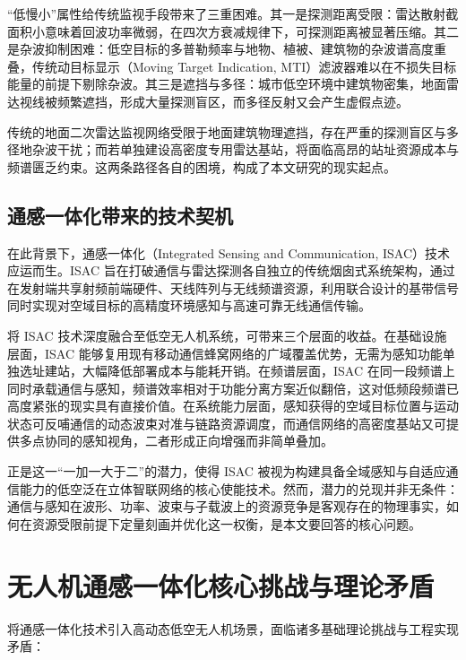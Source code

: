 “低慢小”属性给传统监视手段带来了三重困难。其一是探测距离受限：雷达散射截面积小意味着回波功率微弱，在四次方衰减规律下，可探测距离被显著压缩。其二是杂波抑制困难：低空目标的多普勒频率与地物、植被、建筑物的杂波谱高度重叠，传统动目标显示（Moving Target Indication, MTI）滤波器难以在不损失目标能量的前提下剔除杂波。其三是遮挡与多径：城市低空环境中建筑物密集，地面雷达视线被频繁遮挡，形成大量探测盲区，而多径反射又会产生虚假点迹。

传统的地面二次雷达监视网络受限于地面建筑物理遮挡，存在严重的探测盲区与多径地杂波干扰；而若单独建设高密度专用雷达基站，将面临高昂的站址资源成本与频谱匮乏约束。这两条路径各自的困境，构成了本文研究的现实起点。

\subsection{通感一体化带来的技术契机}
在此背景下，通感一体化（Integrated Sensing and Communication, ISAC）技术应运而生。ISAC 旨在打破通信与雷达探测各自独立的传统烟囱式系统架构，通过在发射端共享射频前端硬件、天线阵列与无线频谱资源，利用联合设计的基带信号同时实现对空域目标的高精度环境感知与高速可靠无线通信传输。

将 ISAC 技术深度融合至低空无人机系统，可带来三个层面的收益。在基础设施层面，ISAC 能够复用现有移动通信蜂窝网络的广域覆盖优势，无需为感知功能单独选址建站，大幅降低部署成本与能耗开销。在频谱层面，ISAC 在同一段频谱上同时承载通信与感知，频谱效率相对于功能分离方案近似翻倍，这对低频段频谱已高度紧张的现实具有直接价值。在系统能力层面，感知获得的空域目标位置与运动状态可反哺通信的动态波束对准与链路资源调度，而通信网络的高密度基站又可提供多点协同的感知视角，二者形成正向增强而非简单叠加。

正是这一“一加一大于二”的潜力，使得 ISAC 被视为构建具备全域感知与自适应通信能力的低空泛在立体智联网络的核心使能技术。然而，潜力的兑现并非无条件：通信与感知在波形、功率、波束与子载波上的资源竞争是客观存在的物理事实，如何在资源受限前提下定量刻画并优化这一权衡，是本文要回答的核心问题。

\section{无人机通感一体化核心挑战与理论矛盾}
\label{sec:challenge}

将通感一体化技术引入高动态低空无人机场景，面临诸多基础理论挑战与工程实现矛盾：

